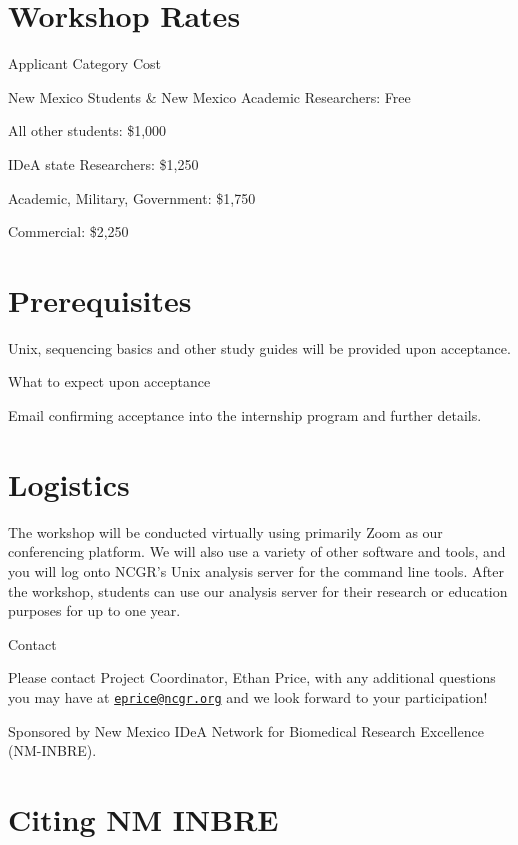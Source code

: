 \documentclass[
]{book}
\begin{document}
\hypertarget{workshop-rates-2}{%
\section*{Workshop Rates}\label{workshop-rates-2}}

Applicant Category Cost

New Mexico Students \& New Mexico Academic Researchers:
Free

All other students:
\$1,000

IDeA state Researchers:
\$1,250

Academic, Military, Government:
\$1,750

Commercial:
\$2,250

\hypertarget{prerequisites-2}{%
\section*{Prerequisites}\label{prerequisites-2}}

Unix, sequencing basics and other study guides will be provided upon acceptance.

What to expect upon acceptance

Email confirming acceptance into the internship program and further details.

\hypertarget{logistics-2}{%
\section*{Logistics}\label{logistics-2}}

The workshop will be conducted virtually using primarily Zoom as our conferencing platform. We will also use a variety of other software and tools, and you will log onto NCGR's Unix analysis server for the command line tools. After the workshop, students can use our analysis server for their research or education purposes for up to one year.

Contact

Please contact Project Coordinator, Ethan Price, with any additional questions you may have at \href{mailto:eprice@ncgr.org}{\nolinkurl{eprice@ncgr.org}} and we look forward to your participation!

Sponsored by New Mexico IDeA Network for Biomedical Research Excellence (NM-INBRE).

\hypertarget{citing-nm-inbre}{%
\section*{Citing NM INBRE}\label{citing-nm-inbre}}
\end{document}
